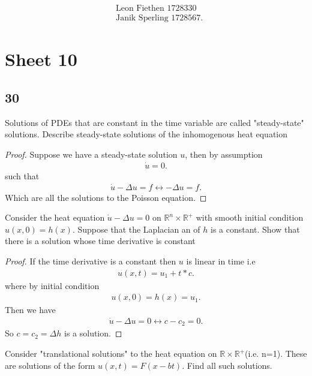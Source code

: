 \begin{align*}
  &\text{Leon Fiethen 1728330}\\
 &\text{Janik Sperling 1728567}
.\end{align*}
\section*{Sheet 10}
\subsection*{30}
\begin{exercise}[a]
 Solutions of PDEs that are constant in the time variable are called "steady-state"  solutions.
 Describe steady-state solutions of the inhomogenous heat equation 
\end{exercise}
\begin{proof}
 Suppose we have a steady-state solution $u$, then  by assumption
 \begin{align*}
  \dot{u} = 0
 .\end{align*}
 such that
 \begin{align*}
  \dot{u}  - \Delta u  = f \leftrightarrow  -\Delta u = f
 .\end{align*}
 Which are all the solutions to the Poisson equation. 
\end{proof}
\begin{exercise}[b]
 Consider the heat equation $\dot{u} - \Delta  u  =0 $  on $\mathbb{R}^{n} \times  \mathbb{R}^{+}  $ with smooth initial condition 
 $u(x,0) = h(x)$. Suppose that the Laplacian an of $h$ is a constant. Show that there is a solution whose time derivative is constant
\end{exercise}
\begin{proof}
  If the time derivative is a constant then $u$ is linear in time i.e 
  \begin{align*}
    u(x,t) = u_{1} + t*c
  .\end{align*}
  where by initial condition 
  \begin{align*}
    u(x,0) = h(x) = u_{1}
  .\end{align*}
  Then we have 
  \begin{align*}
    \dot{u}  - \Delta u = 0 \leftrightarrow c -c_{2} = 0  
  .\end{align*}
  So $c = c_{2} = \Delta h$ is a solution.
\end{proof}
\begin{exercise}[c]
 Consider "translational solutions"  to the heat equation on $\mathbb{R} \times  \mathbb{R}^{+} $(i.e. n=1).
 These are solutions of the form $u(x,t)= F(x-bt)$. Find all such solutions.
\end{exercise}
